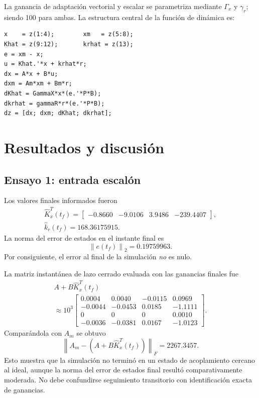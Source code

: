 \documentclass[conference,letterpaper]{IEEEtran}
\newcommand{\norm}[1]{\left\lVert #1\right\rVert}
\begin{document}
La ganancia de adaptación vectorial y escalar se parametriza mediante $\Gamma_x$ y $\gamma_r$; siendo 100 para ambas. La estructura central de la función de dinámica es:

\noindent\begin{minipage}{\linewidth}
\begin{lstlisting}[style=matlab]
x    = z(1:4);        xm   = z(5:8);
Khat = z(9:12);       krhat = z(13);
e = xm - x;
u = Khat.'*x + krhat*r;
dx = A*x + B*u;
dxm = Am*xm + Bm*r;
dKhat = GammaX*x*(e.'*P*B);
dkrhat = gammaR*r*(e.'*P*B);
dz = [dx; dxm; dKhat; dkrhat];
\end{lstlisting}
\end{minipage}

\section{Resultados y discusión}
\subsection{Ensayo 1: entrada escalón}
Los valores finales informados fueron
\begin{equation}\label{eq:stepK}
\begin{gathered}
\hat K_x^T(t_f)=\begin{bmatrix}-0.8660&-9.0106&3.9486&-239.4407\end{bmatrix},\\
\hat k_r(t_f)=168.36175915.
\end{gathered}
\end{equation}
La norma del error de estados en el instante final es
\begin{equation}
    \norm{e(t_f)}_2=0.19759963.
\end{equation}
Por consiguiente, el error al final de la simulación \emph{no} es nulo.

La matriz instantánea de lazo cerrado evaluada con las ganancias finales fue
\begin{equation}\label{eq:aclstep}
    \begin{gathered}
    A+B\hat K_x^T(t_f)\\
    {}\approx 10^3\begin{bmatrix}
     0.0004& 0.0040&-0.0115& 0.0969\\
    -0.0044&-0.0453& 0.0185&-1.1111\\
     0&0&0&0.0010\\
    -0.0036&-0.0381& 0.0167&-1.0123
    \end{bmatrix}.
    \end{gathered}
\end{equation}
Comparándola con $A_m$ se obtuvo
\begin{equation}\label{eq:stepResid}
    \boxed{\norm{A_m-(A+B\hat K_x^T(t_f))}_F=2267.3457.}
\end{equation}
 Esto muestra que la simulación no terminó en un estado de acoplamiento cercano al ideal, aunque la norma del error de estados final resultó comparativamente moderada. No debe confundirse seguimiento transitorio con identificación exacta de ganancias.
\end{document}
